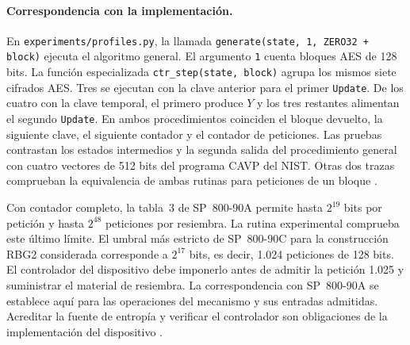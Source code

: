 \documentclass[11pt,a4paper]{article}
\begin{document}
\paragraph{Correspondencia con la implementación.}
En \texttt{experiments/profiles.py}, la llamada \texttt{generate(state, 1, ZERO32 + block)} ejecuta el algoritmo general. El argumento \texttt{1} cuenta bloques AES de 128 bits. La función especializada \texttt{ctr\_step(state, block)} agrupa los mismos siete cifrados AES. Tres se ejecutan con la clave anterior para el primer \texttt{Update}. De los cuatro con la clave temporal, el primero produce \(Y\) y los tres restantes alimentan el segundo \texttt{Update}. En ambos procedimientos coinciden el bloque devuelto, la siguiente clave, el siguiente contador y el contador de peticiones. Las pruebas contrastan los estados intermedios y la segunda salida del procedimiento general con cuatro vectores de 512 bits del programa CAVP del NIST. Otras dos trazas comprueban la equivalencia de ambas rutinas para peticiones de un bloque \cite{cavp,expediente}.

Con contador completo, la tabla~3 de SP~800-90A permite hasta \(2^{19}\) bits por petición y hasta \(2^{48}\) peticiones por resiembra. La rutina experimental comprueba este último límite. El umbral más estricto de SP~800-90C para la construcción RBG2 considerada corresponde a \(2^{17}\) bits, es decir, 1.024 peticiones de 128 bits. El controlador del dispositivo debe imponerlo antes de admitir la petición 1.025 y suministrar el material de resiembra. La correspondencia con SP~800-90A se establece aquí para las operaciones del mecanismo y sus entradas admitidas. Acreditar la fuente de entropía y verificar el controlador son obligaciones de la implementación del dispositivo \cite[tabla~3]{nist90a}\cite[§5.3(6)]{nist90c}.
\end{document}
